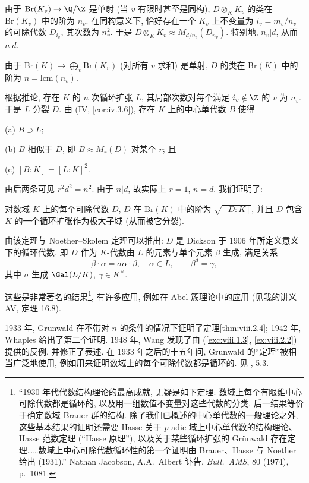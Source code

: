 由于 $\mathrm{Br}(K_v)\to\Q/\Z$ 是单射 (当 $v$ 有限时甚至是同构), $D\otimes_K K_v$ 的类在 $\mathrm{Br}(K_v)$ 中的阶为 $n_v$. 在同构意义下, 恰好存在一个 $K_v$ 上不变量为 $i_v=m_v/n_v$ 的可除代数 $D_{i_v}$, 其次数为 $n_v^{2}$. 于是 $D\otimes_K K_v\approx M_{d/n_v}(D_{n_v})$. 特别地, $n_v|d$, 从而 $n|d$.

由于 $\mathrm{Br}(K)\to\bigoplus_v\mathrm{Br}(K_v)$ (对所有 $v$ 求和) 是单射, $D$ 的类在 $\mathrm{Br}(K)$ 中的阶为 $n=\mathrm{lcm}(n_v)$.

根据推论, 存在 $K$ 的 $n$ 次循环扩张 $L$, 其局部次数对每个满足 $i_v\notin\Z$ 的 $v$ 为 $n_v$. 于是 $L$ 分裂 $D$. 由 (IV, \ref{cor:iv.3.6}), 存在 $K$ 上的中心单代数 $B$ 使得

(a) $B\supset L$;

(b) $B$ 相似于 $D$, 即 $B\approx M_{r}(D)$ 对某个 $r$; 且

(c) $[B:K]=[L:K]^{2}$.

由后两条可见 $r^{2}d^{2}=n^{2}$. 由于 $n|d$, 故实际上 $r=1$, $n=d$. 我们证明了:

\begin{theorem}\label{thm:viii.2.6}
对数域 $K$ 上的每个可除代数 $D$, $D$ 在 $\mathrm{Br}(K)$ 中的阶为 $\sqrt{[D:K]}$, 并且 $D$ 包含 $K$ 的一个循环扩张作为极大子域 (从而被它分裂).
\end{theorem}

由该定理与 Noether--Skolem 定理可以推出: $D$ 是 Dickson 于 1906 年所定义意义下的循环代数, 即 $D$ 作为 $K$-代数由 $L$ 的元素与单个元素 $\beta$ 生成, 满足关系
\[
\beta\cdot\alpha=\sigma\alpha\cdot\beta,\quad \alpha\in L,\qquad \beta^{d}=\gamma,
\]
其中 $\sigma$ 生成 $\Gal(L/K)$, $\gamma\in K^{\times}$.

这些是非常著名的结果\footnote{``1930 年代代数结构理论的最高成就, 无疑是如下定理: 数域上每个有限维中心可除代数都是循环的, 以及用一组数值不变量对这些代数的分类. 后一结果等价于确定数域 Brauer 群的结构. 除了我们已概述的中心单代数的一般理论之外, 这些基本结果的证明还需要 Hasse 关于 $p$-adic 域上中心单代数的结构理论、Hasse 范数定理 (``Hasse 原理''), 以及关于某些循环扩张的 Grünwald 存在定理……数域上中心可除代数循环性的第一个证明由 Brauer、Hasse 与 Noether 给出 (1931).'' Nathan Jacobson, A.A.~Albert 讣告, \emph{Bull.~AMS}, 80 (1974), p.~1081.}, 有许多应用, 例如在 Abel 簇理论中的应用 (见我的讲义 AV, 定理 16.8).

\begin{NOTES}
1933 年, Grunwald 在不带对 $n$ 的条件的情况下证明了定理\ref{thm:viii.2.4}; 1942 年, Whaples 给出了第二个证明. 1948 年, Wang 发现了由 (\ref{exc:viii.1.3}, \ref{ex:viii.2.2}) 提供的反例, 并修正了表述. 在 1933 年之后的十五年间, Grunwald 的``定理''被相当广泛地使用, 例如用来证明数域上的每个可除代数都是循环的. 见 \cite{Roquette2005}, 5.3.
\end{NOTES}


